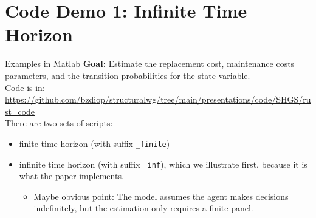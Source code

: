 \documentclass[aspectratio=169]{beamer}
\begin{document}
	\section{Code Demo 1: Infinite Time Horizon}
	
	\begin{frame}{Examples in Matlab}
		\textbf{Goal:} Estimate the replacement cost, maintenance costs parameters, and the transition probabilities for the state variable.\\
		\vspace{0.5cm}
		\pause
		Code is in:\\
		\url{https://github.com/bzdiop/structuralwg/tree/main/presentations/code/SHGS/rust_code}\\
		\vspace{0.5cm}
		\pause
		There are two sets of scripts:
		\begin{itemize}
			\itemsep1em
			
			\item finite time horizon (with suffix \texttt{\_finite}) 
			\item infinite time horizon (with suffix \texttt{\_inf}), which we illustrate first, because it is what the paper implements.
			\begin{itemize}
				\item Maybe obvious point: The model assumes the agent makes decisions indefinitely, but the estimation only requires a finite panel.
			\end{itemize}
		\end{itemize}
	\end{frame}
	
\end{document}
